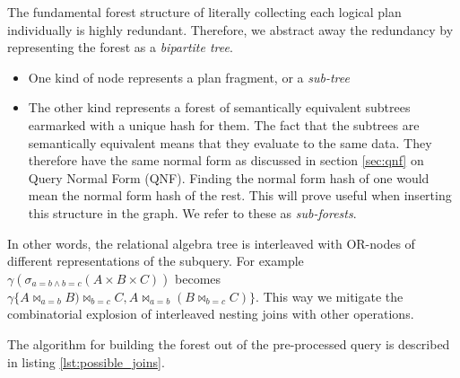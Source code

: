 The fundamental forest structure of literally collecting each logical
plan individually is highly redundant. Therefore, we abstract away the
redundancy by representing the forest as a \emph{bipartite tree}.

\begin{itemize}
\item One kind of node represents a plan fragment, or a \emph{sub-tree}
\item The other kind represents a forest of semantically equivalent
  subtrees earmarked with a unique hash for them. The fact that the
  subtrees are semantically equivalent means that they
  evaluate to the same data. They therefore have the same normal form
  as discussed in section \ref{sec:qnf} on  Query Normal Form (QNF). Finding the normal form
  hash of one would mean the normal form hash of the rest. This will
  prove useful when inserting this structure in the graph. We refer to
  these as \emph{sub-forests}.
\end{itemize}

In other words, the relational algebra tree is interleaved with
OR-nodes of different representations of the subquery. For example
\(\gamma(\sigma_{a=b \land b=c}(A \times B \times C))\) becomes
\(\gamma\{A \Join_{a=b} B) \Join_{b=c} C, A \Join_{a=b} (B \Join_{b=c}
C)\}\). This way we mitigate the combinatorial explosion of interleaved
nesting joins with other operations.

The algorithm for building the forest out of the pre-processed query
is described in listing \ref{lst:possible_joins}.

